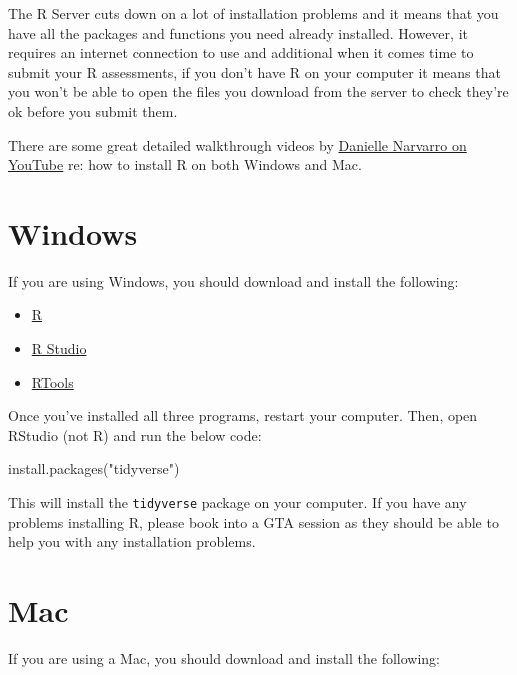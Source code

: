 \documentclass[
  oneside]{book}
\newenvironment{Shaded}{\begin{snugshade}}{\end{snugshade}}
\newcommand{\FunctionTok}[1]{\textcolor[rgb]{0.00,0.00,0.00}{#1}}
\newcommand{\NormalTok}[1]{#1}
\newcommand{\StringTok}[1]{\textcolor[rgb]{0.31,0.60,0.02}{#1}}
\providecommand{\tightlist}{%
  \setlength{\itemsep}{0pt}\setlength{\parskip}{0pt}}
\begin{document}
The R Server cuts down on a lot of installation problems and it means that you have all the packages and functions you need already installed. However, it requires an internet connection to use and additional when it comes time to submit your R assessments, if you don't have R on your computer it means that you won't be able to open the files you download from the server to check they're ok before you submit them.

There are some great detailed walkthrough videos by \href{https://www.youtube.com/playlist?list=PLRPB0ZzEYegOZivdelOuEn-R-XUN-DOjd}{Danielle Narvarro on YouTube} re: how to install R on both Windows and Mac.

\hypertarget{windows}{%
\section{Windows}\label{windows}}

If you are using Windows, you should download and install the following:

\begin{itemize}
\tightlist
\item
  \href{https://cran.r-project.org/bin/windows/base/}{R}
\item
  \href{https://rstudio.com/products/rstudio/download/\#download}{R Studio}
\item
  \href{https://cran.r-project.org/bin/windows/Rtools/}{RTools}
\end{itemize}

Once you've installed all three programs, restart your computer. Then, open RStudio (not R) and run the below code:

\begin{Shaded}
\begin{Highlighting}[]
\FunctionTok{install.packages}\NormalTok{(}\StringTok{"tidyverse"}\NormalTok{)}
\end{Highlighting}
\end{Shaded}

This will install the \texttt{tidyverse} package on your computer. If you have any problems installing R, please book into a GTA session as they should be able to help you with any installation problems.

\hypertarget{mac}{%
\section{Mac}\label{mac}}

If you are using a Mac, you should download and install the following:
\end{document}
